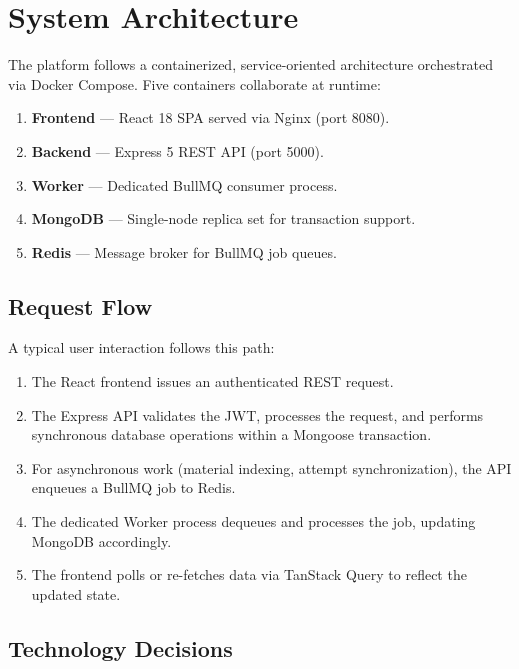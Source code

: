 \documentclass[12pt,a4paper]{article}
\begin{document}
\section{System Architecture}

The platform follows a containerized, service-oriented architecture orchestrated via Docker Compose. Five containers collaborate at runtime:

\begin{enumerate}[leftmargin=1.5cm]
    \item \textbf{Frontend} --- React 18 SPA served via Nginx (port 8080).
    \item \textbf{Backend} --- Express 5 REST API (port 5000).
    \item \textbf{Worker} --- Dedicated BullMQ consumer process.
    \item \textbf{MongoDB} --- Single-node replica set for transaction support.
    \item \textbf{Redis} --- Message broker for BullMQ job queues.
\end{enumerate}

\subsection{Request Flow}
A typical user interaction follows this path:
\begin{enumerate}[leftmargin=1.5cm]
    \item The React frontend issues an authenticated REST request.
    \item The Express API validates the JWT, processes the request, and performs synchronous database operations within a Mongoose transaction.
    \item For asynchronous work (material indexing, attempt synchronization), the API enqueues a BullMQ job to Redis.
    \item The dedicated Worker process dequeues and processes the job, updating MongoDB accordingly.
    \item The frontend polls or re-fetches data via TanStack Query to reflect the updated state.
\end{enumerate}

\subsection{Technology Decisions}
\end{document}
